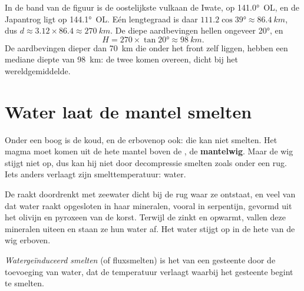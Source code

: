 \begin{example}\label{ex:g12:subduction-magmatism:japan}
In de band van de figuur is de oostelijkste vulkaan de Iwate, op \ang{141.0}~OL,
en de Japantrog ligt op \ang{144.1}~OL. Eén lengtegraad is daar
$111.2\cos\ang{39} \approx \qty{86.4}{km}$, dus $d \approx 3.12 \times 86.4
\approx \qty{270}{km}$. De diepe aardbevingen hellen ongeveer \ang{20}, en
\[
  H = 270 \times \tan\ang{20} \approx \qty{98}{km}.
\]
De aardbevingen dieper dan \qty{70}{km} die onder het front zelf liggen,
hebben een mediane diepte van \qty{98}{km}: de twee komen overeen, dicht bij het
wereldgemiddelde.
\end{example}

\section{Water laat de mantel smelten}

Onder een boog is de  koud, en de  erbovenop ook:
die kan niet smelten. Het magma moet komen uit de hete mantel boven de , de
\textbf{mantelwig}. Maar de wig stijgt niet op, dus kan hij niet door
decompressie smelten zoals onder een rug. Iets anders verlaagt zijn
smelttemperatuur: water.

De  raakt doordrenkt met zeewater dicht bij de rug waar ze ontstaat, en
veel van dat water raakt opgesloten in haar mineralen, vooral in
serpentijn, gevormd uit het olivijn en pyroxeen van de korst. Terwijl de 
zinkt en opwarmt, vallen deze mineralen uiteen en staan ze hun water af. Het
water stijgt op in de hete  van de wig erboven.

\begin{definition}\label{def:g12:subduction-magmatism:hydrous-melting}
\emph{Watergeïnduceerd smelten} (of fluxsmelten) is het
 van een gesteente door de toevoeging van water, dat de
temperatuur verlaagt waarbij het gesteente begint te smelten.
\end{definition}

